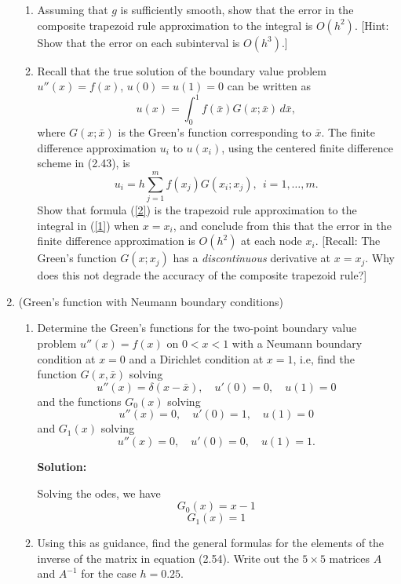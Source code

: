 \documentclass[letterpaper,12pt]{article}
\begin{document}
\begin{enumerate}
\begin{enumerate}
\item
Assuming that $g$ is sufficiently smooth, show that the error in the 
composite trapezoid rule approximation to the integral is $O( h^2 )$.
[Hint:  Show that the error on each subinterval is $O( h^3 )$.]

\item
Recall that the true solution of the boundary value problem $u'' (x) = f(x)$,
$u(0) = u(1) = 0$ can be written as
\begin{equation}
u(x) = \int_0^1 f( \bar{x} ) G(x; \bar{x} )\,d \bar{x} , \label{1}
\end{equation}
where $G(x; \bar{x})$ is the Green's function corresponding to
$\bar{x}$.  The finite difference approximation $u_i$ to $u( x_i )$, 
using the centered finite difference scheme in (2.43), is
\begin{equation}
u_i = h \sum_{j=1}^m f( x_j ) G( x_i ; x_j ) ,~~i=1, \ldots , m . \label{2}
\end{equation}
Show that formula (\ref{2}) is the trapezoid rule approximation to 
the integral in (\ref{1}) when $x = x_i$, and conclude from this that the 
error in the finite difference approximation is $O( h^2 )$ at each node $x_i$. 
[Recall:  The Green's function $G( x ; x_j )$ has a {\em discontinuous}
derivative at $x = x_j$.  Why does this not degrade the accuracy of the
composite trapezoid rule?]
\end{enumerate}

\item (Green's function with Neumann boundary conditions)
\begin{enumerate}
\item
Determine the Green's functions for the two-point boundary
value problem $u''(x) = f(x)$ on $0<x<1$ with a Neumann boundary condition
at $x=0$ and a Dirichlet condition at $x=1$, i.e, find the function
$G(x,\bar x)$ solving
\[
u''(x) = \delta(x-\bar x), \quad u'(0)=0, \quad u(1)=0
\]
and the functions $G_0(x)$ solving
\[
u''(x) = 0, \quad u'(0)=1, \quad u(1)=0
\]
and $G_1(x)$ solving
\[
u''(x) = 0, \quad u'(0)=0, \quad u(1)=1.
\]


{\bf Solution:}

Solving the odes, we have
\[G_0(x) = x-1\]
\[G_1(x) = 1\]
\item
Using this as guidance, find the general formulas for the elements of the
inverse of the matrix in equation (2.54).  Write out the $5\times 5$ matrices
$A$ and $A^{-1}$ for the case $h=0.25$.


\end{enumerate}
\end{enumerate}
\end{document}
